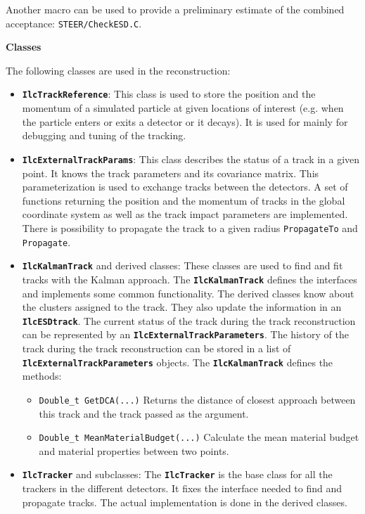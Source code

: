 \documentclass[12pt,a4paper,twoside]{article}
\newcommand{\class}[1]{\texttt{\textbf{#1}}\xspace}
\newcommand{\method}[1]{\texttt{#1}\xspace}
\begin{document}
Another macro can be used to provide a preliminary estimate of the
combined acceptance: \texttt{STEER/CheckESD.C}.

\textbf{Classes}

The following classes are used in the reconstruction:
\begin{itemize}
\item \class{IlcTrackReference}:
  This class is used to store the position and the momentum of a
  simulated particle at given locations of interest (e.g. when the
  particle enters or exits a detector or it decays). It is used for
  mainly for debugging and tuning of the tracking.

\item \class{IlcExternalTrackParams}:
  This class describes the status of a track in a given point.
  It knows the track parameters and its covariance matrix.
  This parameterization is used to exchange tracks between the detectors.
  A set of functions returning the position and the momentum of tracks   
  in the global coordinate system as well as the track impact parameters 
  are implemented. There is possibility to propagate the track to a
  given radius \method{PropagateTo} and \method{Propagate}.

\item \class{IlcKalmanTrack} and derived classes:
  These classes are used to find and fit tracks with the Kalman approach.
  The \class{IlcKalmanTrack} defines the interfaces and implements some
  common functionality. The derived classes know about the clusters
  assigned to the track. They also update the information in an
  \class{IlcESDtrack}. 
  The current status of the track during the track reconstruction can be
  represented by an \class{IlcExternalTrackParameters}. 
  The history of the track during the track reconstruction can be stored
  in a list of \class{IlcExternalTrackParameters} objects. 
  The \class{IlcKalmanTrack} defines the methods:
  \begin{itemize}
  \item \method{Double\_t GetDCA(...)} Returns the distance
    of closest approach between this track and the track passed as the
    argument. 
  \item \method{Double\_t MeanMaterialBudget(...)} Calculate the mean
    material budget and material properties between two points.
  \end{itemize}

\item \class{IlcTracker} and subclasses: 
  The \class{IlcTracker} is the base class for all the trackers in the
  different detectors. It fixes the interface needed to find and
  propagate tracks. The actual implementation is done in the derived classes.


\end{itemize}
\end{document}
